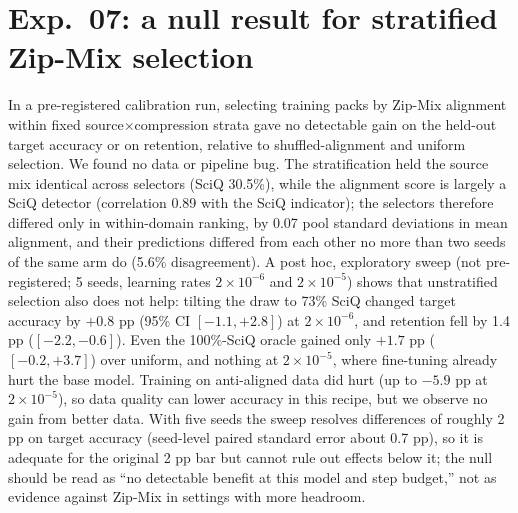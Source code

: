 \section{Exp.\ 07: a null result for stratified Zip-Mix selection}
\label{app:exp07-null}
In a pre-registered calibration run, selecting training packs by Zip-Mix alignment within fixed source$\times$compression strata gave no detectable gain on the held-out target accuracy or on retention, relative to shuffled-alignment and uniform selection.
We found no data or pipeline bug. The stratification held the source mix identical across selectors (SciQ 30.5\%), while the alignment score is largely a SciQ detector (correlation 0.89 with the SciQ indicator); the selectors therefore differed only in within-domain ranking, by 0.07 pool standard deviations in mean alignment, and their predictions differed from each other no more than two seeds of the same arm do (5.6\% disagreement).
A post hoc, exploratory sweep (not pre-registered; 5 seeds, learning rates $2\times10^{-6}$ and $2\times10^{-5}$) shows that unstratified selection also does not help: tilting the draw to 73\% SciQ changed target accuracy by $+0.8$ pp (95\% CI $[-1.1,+2.8]$) at $2\times10^{-6}$, and retention fell by 1.4 pp ($[-2.2,-0.6]$). Even the 100\%-SciQ oracle gained only $+1.7$ pp ($[-0.2,+3.7]$) over uniform, and nothing at $2\times10^{-5}$, where fine-tuning already hurt the base model. Training on anti-aligned data did hurt (up to $-5.9$ pp at $2\times10^{-5}$), so data quality can lower accuracy in this recipe, but we observe no gain from better data.
With five seeds the sweep resolves differences of roughly 2 pp on target accuracy (seed-level paired standard error about 0.7 pp), so it is adequate for the original 2 pp bar but cannot rule out effects below it; the null should be read as ``no detectable benefit at this model and step budget,'' not as evidence against Zip-Mix in settings with more headroom.
